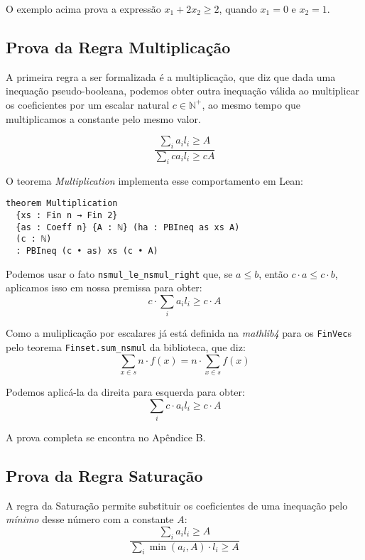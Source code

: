 \documentclass[conference]{IEEEtran}
\begin{document}
O exemplo acima prova a expressão $x_1 + 2 x_2 \ge 2$, quando $x_1 = 0$ e $x_2 = 1$.


\subsection{Prova da Regra Multiplicação}
A primeira regra a ser formalizada é a multiplicação, que diz que dada uma inequação pseudo-booleana, podemos obter
outra inequação válida ao multiplicar os coeficientes por um escalar natural $c \in \mathbb{N}^+ $, ao mesmo tempo que multiplicamos
a constante pelo mesmo valor.

\begin{equation}
    \frac
    {\sum_i{a_i l_i} \ge A}
    {\sum_i{c a_i l_i} \ge c A}
\end{equation}

O teorema \textit{Multiplication} implementa esse comportamento em Lean:
\begin{verbatim}
theorem Multiplication
  {xs : Fin n → Fin 2}
  {as : Coeff n} {A : ℕ} (ha : PBIneq as xs A)
  (c : ℕ)
  : PBIneq (c • as) xs (c • A)
\end{verbatim}

Podemos usar o fato \texttt{nsmul\_le\_nsmul\_right} que, se $a \le b$, então $c \cdot a \le c \cdot b$, aplicamos isso em nossa premissa para obter:
\begin{equation}
    c \cdot \sum_i{a_i l_i} \ge c \cdot A
\end{equation}

Como a muliplicação por escalares já está definida na \textit{mathlib4} para
os \texttt{FinVec}s pelo teorema \texttt{Finset.sum\_nsmul} da biblioteca,
que diz:
\begin{equation}
    \sum_{x \in s}{n \cdot f(x)} = n \cdot \sum_{x \in s}{f(x)}
\end{equation}

Podemos aplicá-la da direita para esquerda para obter:
\begin{equation}
    \sum_i{c \cdot a_i l_i} \ge c \cdot A
\end{equation}

A prova completa se encontra no Apêndice B.


\subsection{Prova da Regra Saturação}
A regra da Saturação permite substituir os coeficientes de uma inequação pelo \textit{mínimo} desse número com a constante $A$:
\begin{equation}
    \frac
    {\sum_i{a_i l_i} \ge A}
    {\sum_i{ \min(a_i,A)\cdot l_i} \ge A}
\end{equation}
\end{document}
